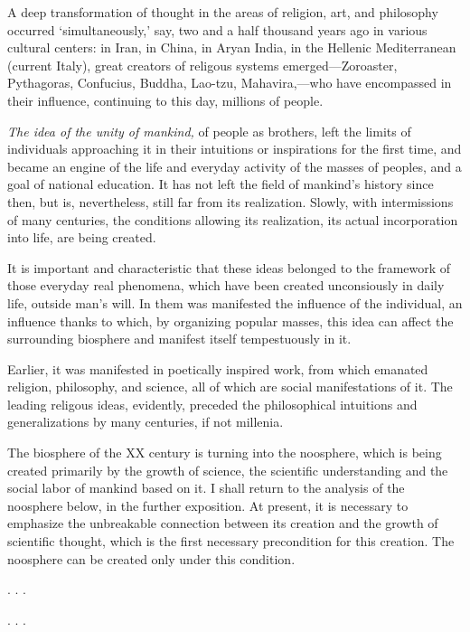 \Section %
A deep transformation of thought in the areas of religion, art, and philosophy
occurred `simultaneously,' say, two and a half thousand years ago in various
cultural centers: in Iran, in China, in Aryan India, in the Hellenic
Mediterranean (current Italy), great creators of religous systems
emerged---Zoroaster, Pythagoras, Confucius, Buddha, Lao-tzu, Mahavira,---who
have encompassed in their influence, continuing to this day, millions of
people.

\emph{The idea of the unity of mankind,} of people as brothers, left the limits
of individuals approaching it in their intuitions or inspirations for the first
time, and became an engine of the life and everyday activity of the masses of
peoples, and a goal of national education.  It has not left the field of
mankind's history since then, but is, nevertheless, still far from its
realization.  Slowly, with intermissions of many centuries, the conditions
allowing its realization, its actual incorporation into life, are being
created.

It is important and characteristic that these ideas belonged to the framework
of those everyday real phenomena, which have been created unconsiously in daily
life, outside man's will.  In them was manifested the influence of the
individual, an influence thanks to which, by organizing popular masses, this
idea can affect the surrounding biosphere and manifest itself tempestuously in
it.

Earlier, it was manifested in poetically inspired work, from which emanated
religion, philosophy, and science, all of which are social manifestations of
it.  The leading religous ideas, evidently, preceded the philosophical
intuitions and generalizations by many centuries, if not millenia.

The biosphere of the XX century is turning into the noosphere, which is being
created primarily by the growth of science, the scientific understanding and
the social labor of mankind based on it.  I shall return to the analysis of the
noosphere below, in the further exposition.  At present, it is necessary to
emphasize the unbreakable connection between its creation and the growth of
scientific thought, which is the first necessary precondition for this
creation.  The noosphere can be created only under this condition.


\Section %

. . .

\Section %

. . .

